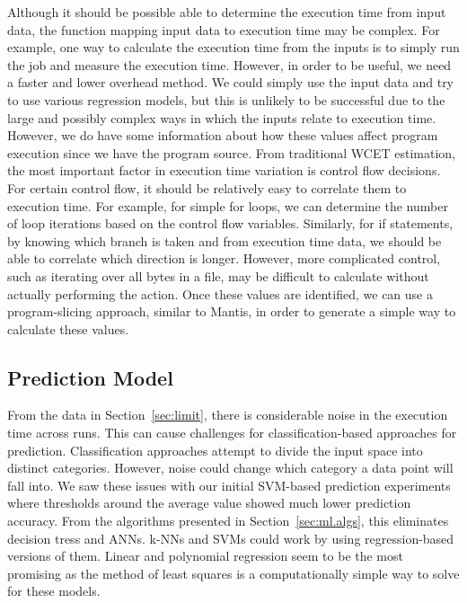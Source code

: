 \documentclass[11pt, letterpaper]{article}
\begin{document}
Although it should be possible able to determine the execution time from input data, the
function mapping input data to execution time may be complex. For example, one
way to calculate the execution time from the inputs is to simply run the job
and measure the execution time. However, in order to be useful, we need a
faster and lower overhead method. We could simply use the input data and try to use various
regression models, but this is unlikely to be successful due to the large
and possibly complex ways in which the inputs relate to execution time.
However, we do have some information about how these values
affect program execution since we have the program source. From traditional
WCET estimation, the most important factor in execution time variation is
control flow decisions. For certain control flow, it should be relatively easy
to correlate them to execution time. For example, for simple for loops, we can
determine the number of loop iterations based on the control flow variables.
Similarly, for if statements, by knowing which branch is taken and from
execution time data, we should be able to correlate which direction is longer.
However, more complicated control, such as iterating over all bytes in a file,
may be difficult to calculate without actually performing the action.
Once these values are identified, we can use a program-slicing approach,
similar to Mantis, in order to generate a simple way to calculate these values.


\subsection{Prediction Model}
From the data in Section~\ref{sec:limit}, there is considerable noise in the
execution time across runs. This can cause challenges for classification-based
approaches for prediction. Classification approaches attempt to divide the
input space into distinct categories. However, noise could change which
category a data point will fall into. We saw these issues with our initial
SVM-based prediction experiments where thresholds around the average value
showed much lower prediction accuracy. From the algorithms presented in
Section~\ref{sec:ml.algs}, this eliminates decision tress and ANNs. k-NNs and
SVMs could work by using regression-based versions of them. Linear and
polynomial regression seem to be the most promising as the method of least
squares is a computationally simple way to solve for these models.
\end{document}
